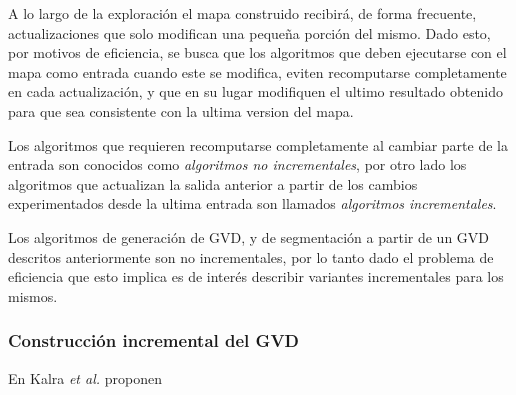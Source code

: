 

A lo largo de la exploración el mapa construido recibirá, de forma frecuente, actualizaciones que solo modifican una pequeña porción del mismo. Dado esto, por motivos de eficiencia, se busca que los algoritmos que deben ejecutarse con el mapa como entrada cuando este se modifica, eviten recomputarse completamente en cada actualización, y que en su lugar modifiquen el ultimo resultado obtenido para que sea consistente con la ultima version del mapa.

Los algoritmos que requieren recomputarse completamente al cambiar parte de la entrada son conocidos como \emph{algoritmos no incrementales}, por otro lado los algoritmos que actualizan la salida anterior a partir de los cambios experimentados desde la ultima entrada son llamados \emph{algoritmos incrementales}.

Los algoritmos de generación de GVD, y de segmentación a partir de un GVD descritos anteriormente son no incrementales, por lo tanto dado el problema de eficiencia que esto implica es de interés describir variantes incrementales para los mismos.

\subsubsection{Construcción incremental del GVD}
En \cite{kalra2009incremental} Kalra \textit{et al.} proponen

